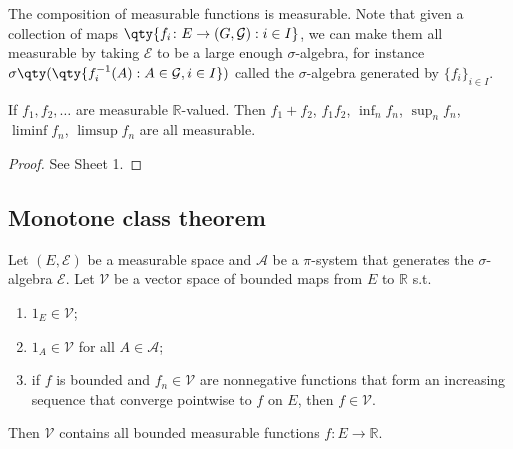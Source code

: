 \begin{example}
	The composition of measurable functions is measurable.
	Note that given a collection of maps $\qty{f_i \colon E \to (G,\mathcal G) : i \in I}$, we can make them all measurable by taking $\mathcal E$ to be a large enough $\sigma$-algebra, for instance $\sigma\qty(\qty{f_i^{-1}(A) : A \in \mathcal G, i \in I})$ called the $\sigma$-algebra generated by $\{f_i\}_{i \in I}$.
\end{example}

\begin{proposition}
	If $f_1, f_2, \dots$ are measurable $\mathbb{R}$-valued. Then $f_1 + f_2$, $f_1 f_2$, $\inf_n f_n$, $\sup_n f_n$, $\liminf f_n$, $\limsup f_n$ are all measurable.
\end{proposition}

\begin{proof}
	See Sheet 1.
\end{proof}

\subsection{Monotone class theorem}
\begin{theorem}
	Let $(E, \mathcal{E})$ be a measurable space and $\mathcal A$ be a $\pi$-system that generates the $\sigma$-algebra $\mathcal E$.
	Let $\mathcal V$ be a vector space of bounded maps from $E$ to $\mathbb R$ s.t.
	\begin{enumerate}
		\item $1_E \in \mathcal V$;
		\item $1_A \in \mathcal V$ for all $A \in \mathcal A$;
		\item if $f$ is bounded and $f_n \in \mathcal V$ are nonnegative functions that form an increasing sequence that converge pointwise to $f$ on $E$, then $f \in \mathcal V$.
	\end{enumerate}
	Then $\mathcal V$ contains all bounded measurable functions $f \colon E \to \mathbb R$.
\end{theorem}

